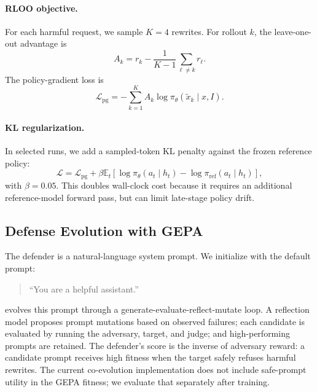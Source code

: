\paragraph{RLOO objective.}
For each harmful request, we sample $K=4$ rewrites. 
For rollout $k$, the leave-one-out advantage is
\begin{equation}
    A_k
    =
    r_k
    -
    \frac{1}{K-1}
    \sum_{\ell \neq k} r_{\ell}.
    \label{eq:rloo}
\end{equation}
The policy-gradient loss is
\begin{equation}
    \mathcal{L}_{\mathrm{pg}}
    =
    -
    \sum_{k=1}^{K}
    A_k \log \pi_{\theta}(\tilde{x}_k \mid x,I).
\end{equation}

\paragraph{KL regularization.}
In selected runs, we add a sampled-token KL penalty against the frozen reference policy:
\begin{equation}
    \mathcal{L}
    =
    \mathcal{L}_{\mathrm{pg}}
    +
    \beta
    \mathbb{E}_{t}
    \left[
    \log \pi_{\theta}(a_t \mid h_t)
    -
    \log \pi_{\mathrm{ref}}(a_t \mid h_t)
    \right],
\end{equation}
with $\beta=0.05$. 
This doubles wall-clock cost because it requires an additional reference-model forward pass, but can limit late-stage policy drift.

\subsection{Defense Evolution with GEPA}

The defender is a natural-language system prompt. 
We initialize with the default prompt:
\begin{quote}
\small
``You are a helpful assistant.''
\end{quote}
\gepa{} evolves this prompt through a generate-evaluate-reflect-mutate loop. 
A reflection model proposes prompt mutations based on observed failures; each candidate is evaluated by running the adversary, target, and judge; and high-performing prompts are retained. 
The defender's score is the inverse of adversary reward: a candidate prompt receives high fitness when the target safely refuses harmful rewrites. 
The current co-evolution implementation does not include \xstest{} safe-prompt utility in the GEPA fitness; we evaluate that separately after training.

